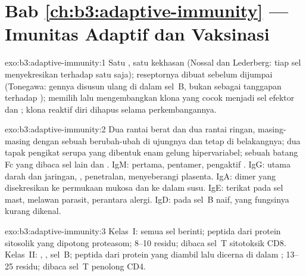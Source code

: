 \section*{Bab \ref{ch:b3:adaptive-immunity} --- Imunitas Adaptif dan Vaksinasi}

\begin{solution}{exo:b3:adaptive-immunity:1}
Satu , satu kekhasan (Nossal dan Lederberg: tiap sel
menyekresikan  terhadap satu  saja); reseptornya dibuat sebelum
 dijumpai (Tonegawa: gennya disusun ulang di dalam sel~B, bukan
sebagai tanggapan terhadap );  memilih lalu mengembangkan klona
yang cocok menjadi sel efektor dan ; klona reaktif diri dihapus selama
perkembangannya.
\end{solution}

\begin{solution}{exo:b3:adaptive-immunity:2}
Dua rantai berat dan dua rantai ringan, masing-masing dengan sebuah 
berubah-ubah di ujungnya dan  tetap di belakangnya; dua tapak pengikat
serupa yang dibentuk enam gelung hipervariabel; sebuah batang Fc yang dibaca sel
lain dan . IgM:  pertama, pentamer, pengaktif . IgG:
 utama darah dan jaringan, , penetralan, menyeberangi plasenta.
IgA: dimer yang disekresikan ke permukaan mukosa dan ke dalam susu. IgE: terikat
pada sel mast, melawan parasit, perantara alergi. IgD: pada sel~B
naif, yang fungsinya kurang dikenal.
\end{solution}

\begin{solution}{exo:b3:adaptive-immunity:3}
Kelas~I: semua sel berinti; peptida dari protein sitosolik yang dipotong
proteasom; 8--10 residu; dibaca sel~T sitotoksik CD8. Kelas~II:
, , sel~B; peptida dari protein yang diambil
lalu dicerna di dalam ; 13--25 residu; dibaca sel~T penolong CD4.
\end{solution}


